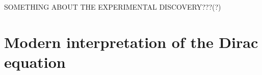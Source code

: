 SOMETHING ABOUT THE EXPERIMENTAL DISCOVERY???(?)\cite{anderson_positive_1933}




\section{Modern interpretation of the Dirac equation}